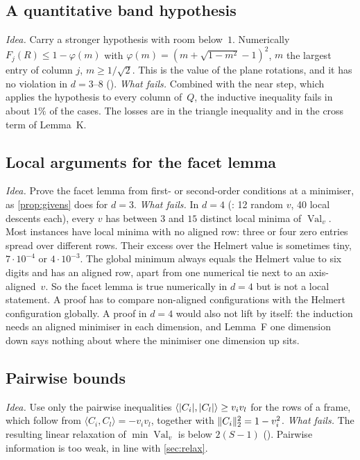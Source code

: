 \documentclass[11pt,a4paper]{article}
\newcommand{\Val}{\operatorname{Val}}
\begin{document}
\subsection{A quantitative band hypothesis}
\emph{Idea.} Carry a stronger hypothesis with room below~$1$. Numerically $F_j(R)\le1-\varphi(m)$ with $\varphi(m)=(m+\sqrt{1-m^2}-1)^2$, $m$ the largest entry of column $j$, $m\ge1/\sqrt2$. This is the value of the plane rotations, and it has no violation in $d=3$--$8$ (). \emph{What fails.} Combined with the near step, which applies the hypothesis to every column of~$Q$, the inductive inequality fails in about $1\%$ of the cases. The losses are in the triangle inequality and in the cross term of Lemma~K.

\subsection{Local arguments for the facet lemma}\label{sec:local}
\emph{Idea.} Prove the facet lemma from first- or second-order conditions at a minimiser, as \cref{prop:givens} does for $d=3$. \emph{What fails.} In $d=4$ (: 12 random $v$, 40 local descents each), every $v$ has between $3$ and $15$ distinct local minima of $\Val_v$. Most instances have local minima with no aligned row: three or four zero entries spread over different rows. Their excess over the Helmert value is sometimes tiny, $7\cdot10^{-4}$ or $4\cdot10^{-3}$. The global minimum always equals the Helmert value to six digits and has an aligned row, apart from one numerical tie next to an axis-aligned~$v$. So the facet lemma is true numerically in $d=4$ but is not a local statement. A proof has to compare non-aligned configurations with the Helmert configuration globally. A proof in $d=4$ would also not lift by itself: the induction needs an aligned minimiser in each dimension, and Lemma~F one dimension down says nothing about where the minimiser one dimension up sits.

\subsection{Pairwise bounds}
\emph{Idea.} Use only the pairwise inequalities $\langle\lvert C_i\rvert,\lvert C_l\rvert\rangle\ge v_iv_l$ for the rows of a frame, which follow from $\langle C_i,C_l\rangle=-v_iv_l$, together with $\lVert C_i\rVert_2^2=1-v_i^2$. \emph{What fails.} The resulting linear relaxation of $\min\Val_v$ is below $2(S-1)$ (). Pairwise information is too weak, in line with \cref{sec:relax}.
\end{document}
